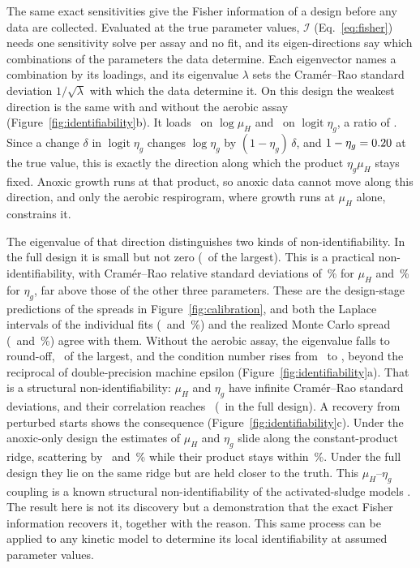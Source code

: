 \documentclass{article}
\begin{document}
The same exact sensitivities give the Fisher information of a design before any data are collected. Evaluated at the true parameter values, \(\boldsymbol{\mathcal{I}}\) (Eq.~\eqref{eq:fisher}) needs one sensitivity solve per assay and no fit, and its eigen-directions say which combinations of the parameters the data determine. Each eigenvector names a combination by its loadings, and its eigenvalue \(\lambda\) sets the Cram\'er--Rao standard deviation \(1/\sqrt{\lambda}\) with which the data determine it. On this design the weakest direction is the same with and without the aerobic assay (Figure~\ref{fig:identifiability}b). It loads \IdentWeakLoadMu\ on \(\log\mu_H\) and \IdentWeakLoadEtag\ on \(\operatorname{logit}\eta_g\), a ratio of \IdentWeakLoadRatio. Since a change \(\delta\) in \(\operatorname{logit}\eta_g\) changes \(\log\eta_g\) by \((1-\eta_g)\,\delta\), and \(1-\eta_g=0.20\) at the true value, this is exactly the direction along which the product \(\eta_g\mu_H\) stays fixed. Anoxic growth runs at that product, so anoxic data cannot move along this direction, and only the aerobic respirogram, where growth runs at \(\mu_H\) alone, constrains it.

The eigenvalue of that direction distinguishes two kinds of non-identifiability. In the full design it is small but not zero (\IdentWeakRelFull\ of the largest). This is a practical non-identifiability, with Cram\'er--Rao relative standard deviations of \IdentCrbMuFull\,\% for \(\mu_H\) and \IdentCrbEtagFull\,\% for \(\eta_g\), far above those of the other three parameters. These are the design-stage predictions of the spreads in Figure~\ref{fig:calibration}, and both the Laplace intervals of the individual fits (\CalPredCVmu\ and \CalPredCVetag\,\%) and the realized Monte Carlo spread (\CalEmpCVmu\ and \CalEmpCVetag\,\%) agree with them. Without the aerobic assay, the eigenvalue falls to round-off, \IdentWeakRelAnox\ of the largest, and the condition number rises from \IdentKappaFull\ to \IdentKappaAnox, beyond the reciprocal of double-precision machine epsilon (Figure~\ref{fig:identifiability}a). That is a structural non-identifiability: \(\mu_H\) and \(\eta_g\) have infinite Cram\'er--Rao standard deviations, and their correlation reaches \IdentCorrAnox\ (\IdentCorrFull\ in the full design). A recovery from perturbed starts shows the consequence (Figure~\ref{fig:identifiability}c). Under the anoxic-only design the estimates of \(\mu_H\) and \(\eta_g\) slide along the constant-product ridge, scattering by \IdentMuCVanox\ and \IdentEtagCVanox\,\% while their product stays within \IdentProductCVanox\,\%. Under the full design they lie on the same ridge but are held closer to the truth. This \(\mu_H\)--\(\eta_g\) coupling is a known structural non-identifiability of the activated-sludge models \citep{vanrolleghem1995}. The result here is not its discovery but a demonstration that the exact Fisher information recovers it, together with the reason. This same process can be applied to any kinetic model to determine its local identifiability at assumed parameter values.
\end{document}
